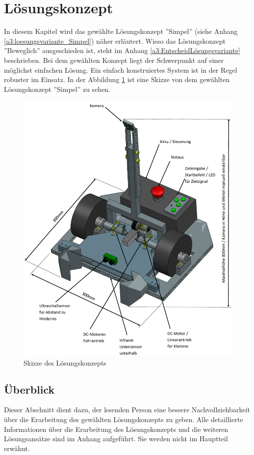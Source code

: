 \documentclass[../main.tex]{subfiles}
\begin{document}
\newpage
\section{Lösungskonzept}\label{lösungskonzept}

In diesem Kapitel wird das gewählte Lösungskonzept ''Simpel'' (siehe Anhang \ref{a3:loesungsvariante_Simpel}) näher erläutert. Wieso das Lösungskonzept ''Beweglich'' ausgeschieden ist, steht im Anhang \ref{a3:EntscheidLösungsvariante} beschrieben. Bei dem gewählten Konzept liegt der Schwerpunkt auf einer möglichst einfachen Lösung. Ein einfach konstruiertes System ist in der Regel robuster im Einsatz. In der Abbildung \ref{img:Konzept-Skizze_Fahrzeug} ist eine Skizze von dem gewählten Lösungskonzept ''Simpel'' zu sehen.

\begin{figure}[H]
\centering
\includegraphics[width=0.85\linewidth]{Skizze Konzept beschriftet.png}
\caption{Skizze des Lösungskonzepts}
\label{img:Konzept-Skizze_Fahrzeug}
\end{figure}

\newpage
\subsection{Überblick}
Dieser Abschnitt dient dazu, der lesenden Person eine bessere Nachvollziehbarkeit über die Erarbeitung des gewählten Lösungskonzepts zu geben.
Alle detaillierte Informationen über die Erarbeitung des Lösungskonzepts und die weiteren Lösungsansätze sind im Anhang aufgeführt. Sie werden nicht im Hauptteil erwähnt.
\end{document}
